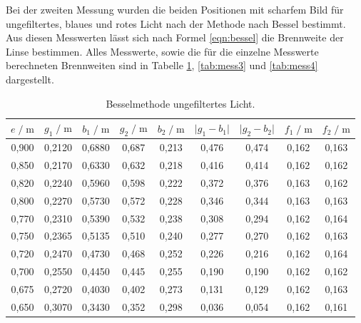 Bei der zweiten Messung wurden die beiden Positionen mit scharfem Bild für ungefiltertes, 
blaues und rotes Licht nach der Methode nach Bessel bestimmt. Aus diesen Messwerten lässt 
sich nach Formel \eqref{eqn:bessel} die Brennweite der Linse bestimmen. Alles Messwerte, sowie die für die
einzelne Messwerte berechneten Brennweiten sind in Tabelle \ref{tab:mess2}, 
\ref{tab:mess3} und \ref{tab:mess4} dargestellt. 

\begin{table}
    \centering
    \caption{Besselmethode ungefiltertes Licht.}
    \label{tab:mess2}
    \begin{tabular}{c c c c c c c c c}
    \toprule
    $ e \;/\; \si{\meter} $ & $g_1 \;/\; \si{\meter}$ &
    $ b_1 \;/\; \si{\meter}$ & $g_2 \;/\; \si{\meter}$ & 
    $ b_2 \;/\; \si{\meter}$ & $\vert g_1 - b_1 \vert$ & 
    $ \vert g_2 - b_2 \vert$ & $ f_1 \;/\; \si{\meter}$ &
    $ f_2 \;/\; \si{\meter}$\\
    \midrule 
        0,900 & 0,2120 & 0,6880 & 0,687 & 0,213 & 0,476 & 0,474 & 0,162 & 0,163\\
        0,850 & 0,2170 & 0,6330 & 0,632 & 0,218 & 0,416 & 0,414 & 0,162 & 0,162\\
        0,820 & 0,2240 & 0,5960 & 0,598 & 0,222 & 0,372 & 0,376 & 0,163 & 0,162\\
        0,800 & 0,2270 & 0,5730 & 0,572 & 0,228 & 0,346 & 0,344 & 0,163 & 0,163\\
        0,770 & 0,2310 & 0,5390 & 0,532 & 0,238 & 0,308 & 0,294 & 0,162 & 0,164\\
        0,750 & 0,2365 & 0,5135 & 0,510 & 0,240 & 0,277 & 0,270 & 0,162 & 0,163\\
        0,720 & 0,2470 & 0,4730 & 0,468 & 0,252 & 0,226 & 0,216 & 0,162 & 0,164\\
        0,700 & 0,2550 & 0,4450 & 0,445 & 0,255 & 0,190 & 0,190 & 0,162 & 0,162\\
        0,675 & 0,2720 & 0,4030 & 0,402 & 0,273 & 0,131 & 0,129 & 0,162 & 0,163\\
        0,650 & 0,3070 & 0,3430 & 0,352 & 0,298 & 0,036 & 0,054 & 0,162 & 0,161\\          
    \bottomrule
    \end{tabular}
    \end{table}

